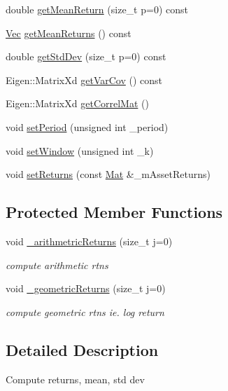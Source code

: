 \begin{DoxyCompactItemize}
\item 
double \hyperlink{classComputeReturn_ab83426d16e1c870e18278db3d6b4deeb}{get\+Mean\+Return} (size\+\_\+t p=0) const
\item 
\hyperlink{compute__returns__eigen_8h_a1eb6a9306ef406d7975f3cbf2e247777}{Vec} \hyperlink{classComputeReturn_a4ea1191d38980ccebc6603e4f4fb7dce}{get\+Mean\+Returns} () const
\item 
double \hyperlink{classComputeReturn_a7aac48c9abb168e956412bf9d509cb35}{get\+Std\+Dev} (size\+\_\+t p=0) const
\item 
Eigen\+::\+Matrix\+Xd \hyperlink{classComputeReturn_a3d312fabfda99b5405e7aeab2af2fc8c}{get\+Var\+Cov} () const
\item 
Eigen\+::\+Matrix\+Xd \hyperlink{classComputeReturn_a16b185325ca2cb87991b6db59aa63de8}{get\+Correl\+Mat} ()
\item 
void \hyperlink{classComputeReturn_a6250a32e8ac308d3642bb81154ceb785}{set\+Period} (unsigned int \+\_\+period)
\item 
void \hyperlink{classComputeReturn_ae4ae713d72c4015860a8e562dfd51e75}{set\+Window} (unsigned int \+\_\+k)
\item 
void \hyperlink{classComputeReturn_ae0594e2da22ca9c96a4ce4f3eebc41eb}{set\+Returns} (const \hyperlink{compute__returns__eigen_8h_ae14dd28696f743e067dbd2594616bad6}{Mat} \&\+\_\+m\+Asset\+Returns)
\end{DoxyCompactItemize}
\subsection*{Protected Member Functions}
\begin{DoxyCompactItemize}
\item 
void \hyperlink{classComputeReturn_a80678bbba59305a392d001260fb2d32b}{\+\_\+arithmetric\+Returns} (size\+\_\+t j=0)
\begin{DoxyCompactList}\small\item\em compute arithmetic rtns \end{DoxyCompactList}\item 
void \hyperlink{classComputeReturn_a9738eae9cbcbe4d75a86335d95adc758}{\+\_\+geometric\+Returns} (size\+\_\+t j=0)
\begin{DoxyCompactList}\small\item\em compute geometric rtns ie. log return \end{DoxyCompactList}\end{DoxyCompactItemize}


\subsection{Detailed Description}
Compute returns, mean, std dev

